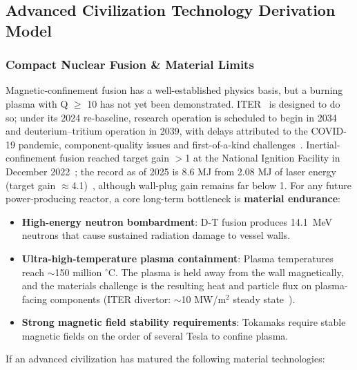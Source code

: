 \documentclass[aps,prd,twocolumn,superscriptaddress,nofootinbib]{revtex4-2}
\begin{document}
\subsection{Advanced Civilization Technology Derivation Model}\label{sec:advanced-tech}

\subsubsection{Compact Nuclear Fusion \& Material Limits}\label{sec:compact-fusion}

Magnetic-confinement fusion has a well-established physics basis, but a burning plasma with Q $\geq$ 10 has not yet been demonstrated. ITER~\cite{ITER} is designed to do so; under its 2024 re-baseline, research operation is scheduled to begin in 2034 and deuterium--tritium operation in 2039, with delays attributed to the COVID-19 pandemic, component-quality issues and first-of-a-kind challenges~\cite{ITER2024baseline}. Inertial-confinement fusion reached target gain $>$1 at the National Ignition Facility in December 2022~\cite{AbuShawareb2024}; the record as of 2025 is 8.6 MJ from 2.08 MJ of laser energy (target gain $\approx$4.1)~\cite{LLNL2025NIF}, although wall-plug gain remains far below 1. For any future power-producing reactor, a core long-term bottleneck is \textbf{material endurance}:

\begin{itemize}
  \item \textbf{High-energy neutron bombardment}: D-T fusion produces \SI{14.1}{MeV} neutrons that cause sustained radiation damage to vessel walls.
  \item \textbf{Ultra-high-temperature plasma containment}: Plasma temperatures reach ${\sim}$150 million $^{\circ}$C. The plasma is held away from the wall magnetically, and the materials challenge is the resulting heat and particle flux on plasma-facing components (ITER divertor: ${\sim}$10 MW/m$^{2}$ steady state~\cite{ITER_Divertor}).
  \item \textbf{Strong magnetic field stability requirements}: Tokamaks require stable magnetic fields on the order of several Tesla to confine plasma.
\end{itemize}

If an advanced civilization has matured the following material technologies:
\end{document}
